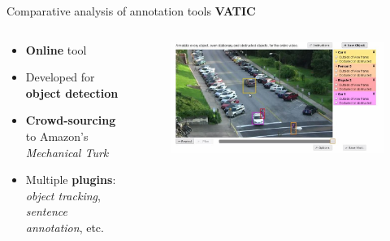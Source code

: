\documentclass{beamer}
\begin{document}
\begin{tframe}{Comparative analysis of annotation tools}
\textbf{VATIC} 
\begin{columns}[t] %
\begin{column}{.45\textwidth}
\begin{itemize}
\item \textbf{Online} tool
\vspace{0.1cm}
\item Developed for \textbf{object detection}
\vspace{0.1cm}
\item \textbf{Crowd-sourcing} to Amazon's \emph{Mechanical Turk}
\vspace{0.1cm}
\item Multiple \textbf{plugins}: \emph{object tracking}, \emph{sentence annotation}, etc.
\end{itemize}
\end{column}%
\begin{column}{.3\textwidth}
\begin{figure}[h]
\centering
\includegraphics[scale=0.2]{images/vatic.jpg}
\end{figure}
\end{column}%
\end{columns}
\end{tframe}
\end{document}
